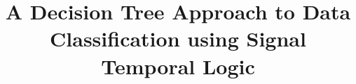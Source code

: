 \documentclass{acm_proc_article-sp}
\begin{document}
\title{A Decision Tree Approach to Data Classification using Signal Temporal Logic
}
%
%
%
%
%
\end{document}
